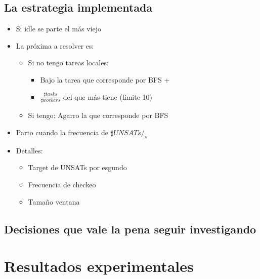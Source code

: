 \subsection{La estrategia implementada}



\begin{itemize}
	\item Si idle se parte el más viejo
	\item La próxima a resolver es:
		\begin{itemize}
			\item Si no tengo tareas locales:
				\begin{itemize}
					\item Bajo la tarea que corresponde por BFS +
					\item $\frac{\sharp tasks}{\sharp workers}$ del que más tiene (límite 10)
				\end{itemize}
			\item Si tengo: Agarro la que corresponde por BFS
		\end{itemize}
	\item Parto cuando la frecuencia de $\sharp UNSATs/_s$
	\item Detalles:
	\begin{itemize}
		\item Target de UNSATs por esgundo
		\item Frecuencia de checkeo
		\item Tamaño ventana
	\end{itemize}
\end{itemize}

\subsection{Decisiones que vale la pena seguir investigando}

\section{Resultados experimentales}

